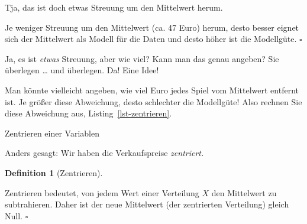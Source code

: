 \documentclass[
  letterpaper,
  twoside,
  open=any]{scrbook}
\newenvironment{Shaded}{\begin{snugshade}}{\end{snugshade}}
\newcommand{\AttributeTok}[1]{\textcolor[rgb]{0.40,0.45,0.13}{#1}}
\newcommand{\FloatTok}[1]{\textcolor[rgb]{0.68,0.00,0.00}{#1}}
\newcommand{\FunctionTok}[1]{\textcolor[rgb]{0.28,0.35,0.67}{#1}}
\newcommand{\NormalTok}[1]{\textcolor[rgb]{0.00,0.23,0.31}{#1}}
\newcommand{\OtherTok}[1]{\textcolor[rgb]{0.00,0.23,0.31}{#1}}
\newcommand{\SpecialCharTok}[1]{\textcolor[rgb]{0.37,0.37,0.37}{#1}}
\theoremstyle{definition}
\newtheorem{definition}{Definition}[chapter]
\theoremstyle{definition}
\theoremstyle{definition}
\theoremstyle{remark}
\begin{document}
Tja, das ist doch etwas Streuung um den Mittelwert herum.

\begin{tcolorbox}[enhanced jigsaw, colbacktitle=quarto-callout-important-color!10!white, colframe=quarto-callout-important-color-frame, coltitle=black, arc=.35mm, breakable, opacitybacktitle=0.6, toprule=.15mm, colback=white, rightrule=.15mm, opacityback=0, toptitle=1mm, title=\textcolor{quarto-callout-important-color}{\faExclamation}\hspace{0.5em}{Wichtig}, titlerule=0mm, bottomtitle=1mm, bottomrule=.15mm, leftrule=.75mm, left=2mm]

Je weniger Streuung um den Mittelwert (ca. 47 Euro) herum, desto besser
eignet sich der Mittelwert als Modell für die Daten und desto höher ist
die Modellgüte. \(\square\)

\end{tcolorbox}

Ja, es ist \emph{etwas} Streuung, aber wie viel? Kann man das genau
angeben? Sie überlegen \ldots{} und überlegen. Da! Eine Idee!

Man könnte vielleicht angeben, wie viel Euro jedes Spiel vom Mittelwert
entfernt ist. Je größer diese Abweichung, desto schlechter die
Modellgüte! Also rechnen Sie diese Abweichung aus,
Listing~\ref{lst-zentrieren}.

\begin{codelisting}

\caption{\label{lst-zentrieren}Zentrieren einer Variablen}

\centering{

\begin{Shaded}
\begin{Highlighting}[]
\NormalTok{mariokart\_no\_extreme }\OtherTok{\textless{}{-}}
\NormalTok{  mariokart\_no\_extreme }\SpecialCharTok{\%\textgreater{}\%} 
  \FunctionTok{mutate}\NormalTok{(}\AttributeTok{abw =} \FloatTok{47.4} \SpecialCharTok{{-}}\NormalTok{ total\_pr)}
\end{Highlighting}
\end{Shaded}

}

\end{codelisting}%

Anders gesagt: Wir haben die Verkaufspreise \emph{zentriert.}

\begin{definition}[Zentrieren]\protect\hypertarget{def-zentrieren}{}\label{def-zentrieren}

Zentrieren bedeutet, von jedem Wert einer Verteilung \(X\) den
Mittelwert zu subtrahieren. Daher ist der neue Mittelwert (der
zentrierten Verteilung) gleich Null. \(\square\)

\end{definition}
\end{document}

